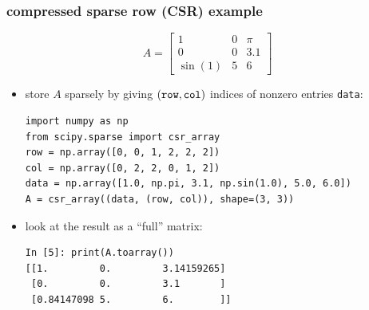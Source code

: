 \documentclass[10pt,
               svgnames,
               hyperref={colorlinks,citecolor=DeepPink4,linkcolor=FireBrick,urlcolor=Maroon},
               usepdftitle=false]{beamer}
\begin{document}
\begin{frame}[fragile]
\frametitle{compressed sparse row (CSR) example}

$$A = \begin{bmatrix} 1 & 0 & \pi \\ 0 & 0 & 3.1 \\ \sin(1) & 5 & 6 \end{bmatrix}$$

\begin{itemize}
\item store $A$ sparsely by giving $(\text{\texttt{row}},\text{\texttt{col}})$ indices of nonzero entries \texttt{data}:

\begin{center}
\begin{minipage}{0.85\textwidth}
\begin{verbatim}
import numpy as np
from scipy.sparse import csr_array
row = np.array([0, 0, 1, 2, 2, 2])
col = np.array([0, 2, 2, 0, 1, 2])
data = np.array([1.0, np.pi, 3.1, np.sin(1.0), 5.0, 6.0])
A = csr_array((data, (row, col)), shape=(3, 3))
\end{verbatim}
\end{minipage}
\end{center}

\bigskip
\item look at the result as a ``full'' matrix:
\begin{center}
\begin{minipage}{0.8\textwidth}
\begin{verbatim}
In [5]: print(A.toarray())
[[1.         0.         3.14159265]
 [0.         0.         3.1       ]
 [0.84147098 5.         6.        ]]
 
 
 
\end{verbatim}
\end{minipage}
\end{center}
\end{itemize}
\end{frame}
\end{document}
